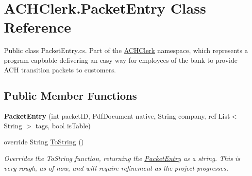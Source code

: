 \hypertarget{class_a_c_h_clerk_1_1_packet_entry}{\section{A\+C\+H\+Clerk.\+Packet\+Entry Class Reference}
\label{class_a_c_h_clerk_1_1_packet_entry}
}


Public class Packet\+Entry.\+cs. Part of the \hyperlink{namespace_a_c_h_clerk}{A\+C\+H\+Clerk} namespace, which represents a program capbable delivering an easy way for employees of the bank to provide A\+C\+H transition packets to customers.  


\subsection*{Public Member Functions}
\begin{DoxyCompactItemize}
\item 
\hypertarget{class_a_c_h_clerk_1_1_packet_entry_ac7d87dd3e746dc246c08fb42fd9e733d}{{\bfseries Packet\+Entry} (int packet\+I\+D, Pdf\+Document native, String company, ref List$<$ String $>$ tags, bool is\+Table)}\label{class_a_c_h_clerk_1_1_packet_entry_ac7d87dd3e746dc246c08fb42fd9e733d}

\item 
override String \hyperlink{class_a_c_h_clerk_1_1_packet_entry_a08b5203632609dad4bc69c1251d8f444}{To\+String} ()
\begin{DoxyCompactList}\small\item\em Overrides the To\+String function, returning the \hyperlink{class_a_c_h_clerk_1_1_packet_entry}{Packet\+Entry} as a string. This is very rough, as of now, and will require refinement as the project progresses. \end{DoxyCompactList}\end{DoxyCompactItemize}
